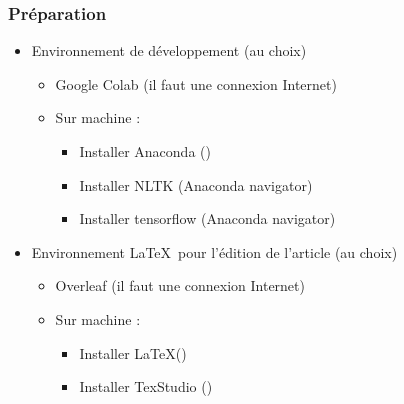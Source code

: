 \documentclass{beamer}
\begin{document}
\begin{frame}
	\frametitle{Préparation}
	
	\begin{itemize}
		\item Environnement de développement (au choix)
		\begin{itemize}
			\item Google Colab (il faut une connexion Internet)
			\item Sur machine :
			\begin{itemize}
				\item Installer Anaconda ()
				\item Installer NLTK (Anaconda navigator)
				\item Installer tensorflow (Anaconda navigator)
			\end{itemize}
		\end{itemize}
		\item Environnement \LaTeX\ pour l'édition de l'article (au choix)
		\begin{itemize}
			\item Overleaf (il faut une connexion Internet)
			\item Sur machine :
			\begin{itemize}
				\item Installer \LaTeX ()
				\item Installer TexStudio ()
			\end{itemize}
		\end{itemize}
	\end{itemize}
	
\end{frame}
\end{document}
